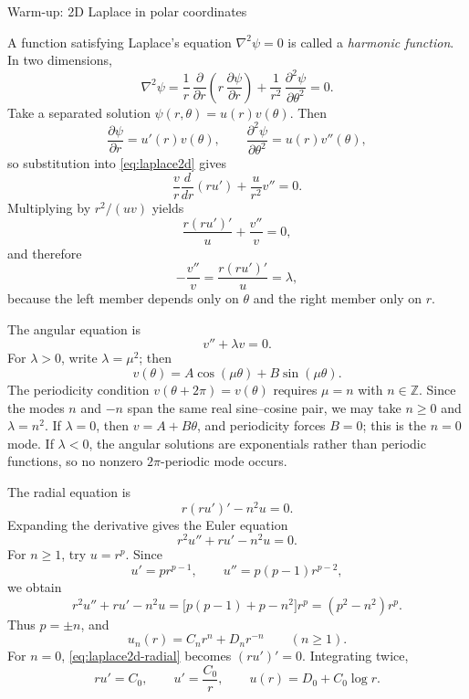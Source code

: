 \documentclass[11pt]{beamer}
\begin{document}
\begin{frame}[allowframebreaks]{Warm-up: 2D Laplace in polar coordinates}
\footnotesize

A function satisfying Laplace's equation $\nabla^2\psi=0$ is called a \emph{harmonic
function}. In two dimensions,
\begin{equation}
  \nabla^2\psi
   = \frac{1}{r}\,\frac{\partial}{\partial r}\!\left(r\,\frac{\partial\psi}{\partial r}\right)
   + \frac{1}{r^2}\,\frac{\partial^2\psi}{\partial\theta^2} = 0.
  \label{eq:laplace2d}
\end{equation}
Take a separated solution $\psi(r,\theta)=u(r)v(\theta)$. Then
\[
  \frac{\partial\psi}{\partial r}=u'(r)v(\theta),
  \qquad
  \frac{\partial^2\psi}{\partial\theta^2}=u(r)v''(\theta),
\]
so substitution into \eqref{eq:laplace2d} gives
\[
  \frac{v}{r}\frac{d}{dr}\!\left(ru'\right)+\frac{u}{r^2}v''=0.
\]
Multiplying by $r^2/(uv)$ yields
\[
  \frac{r(ru')'}{u}+\frac{v''}{v}=0,
\]
and therefore
\begin{equation}
  -\frac{v''}{v}=\frac{r(ru')'}{u}=\lambda,
  \label{eq:laplace2d-separation}
\end{equation}
because the left member depends only on $\theta$ and the right member only on $r$.

The angular equation is
\[
  v''+\lambda v=0.
\]
For $\lambda>0$, write $\lambda=\mu^2$; then
\[
  v(\theta)=A\cos(\mu\theta)+B\sin(\mu\theta).
\]
The periodicity condition $v(\theta+2\pi)=v(\theta)$ requires $\mu=n$ with
$n\in\mathbb Z$. Since the modes $n$ and $-n$ span the same real sine--cosine pair, we
may take $n\ge0$ and $\lambda=n^2$. If $\lambda=0$, then $v=A+B\theta$, and periodicity
forces $B=0$; this is the $n=0$ mode. If $\lambda<0$, the angular solutions are
exponentials rather than periodic functions, so no nonzero $2\pi$-periodic mode occurs.

The radial equation is
\[
  r(ru')'-n^2u=0.
\]
Expanding the derivative gives the Euler equation
\begin{equation}
  r^2u''+ru'-n^2u=0.
  \label{eq:laplace2d-radial}
\end{equation}
For $n\ge1$, try $u=r^p$. Since
\[
  u'=pr^{p-1},
  \qquad
  u''=p(p-1)r^{p-2},
\]
we obtain
\[
  r^2u''+ru'-n^2u
   =\bigl[p(p-1)+p-n^2\bigr]r^p
   =(p^2-n^2)r^p.
\]
Thus $p=\pm n$, and
\[
  u_n(r)=C_nr^n+D_nr^{-n}
  \qquad(n\ge1).
\]
For $n=0$, \eqref{eq:laplace2d-radial} becomes $(ru')'=0$. Integrating twice,
\[
  ru'=C_0,
  \qquad
  u'=\frac{C_0}{r},
  \qquad
  u(r)=D_0+C_0\log r.
\]


\end{frame}
\end{document}
